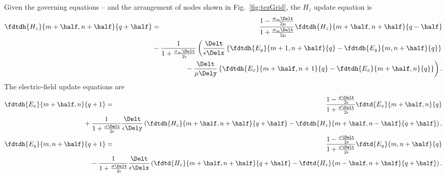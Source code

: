 Given the governing equations -- and the
arrangement of nodes shown in Fig.\ \ref{fig:tezGrid}, the $H_z$ update
equation is
\begin{eqnarray}
  \fdtdh{H_z}{m+\half,n+\half}{q+\half} &=&
  \frac{1-\frac{\sigma_m\Delt}{2\mu}}{1+\frac{\sigma_m\Delt}{2\mu}}
  \fdtdh{H_z}{m+\half,n+\half}{q-\half}
 \nonumber\\
  && \hspace{-.35in}\mbox{} -
  \frac{1}{1+\frac{\sigma_m\Delt}{2\epsilon}}
  \left(
    \frac{\Delt}{\epsilon\Delx}
    \left\{
      \fdtdh{E_y}{m+1,n+\half}{q} - \fdtdh{E_y}{m,n+\half}{q}
    \right\} \right.\nonumber\\
  && \hspace{.366in}\left.\mbox{}-
    \frac{\Delt}{\mu\Dely}
    \left\{
      \fdtdh{E_x}{m+\half,n+1}{q} - \fdtdh{E_x}{m+\half,n}{q}
    \right\}
  \right).
\end{eqnarray}
The electric-field update equations are
\begin{eqnarray}
  \fdtdh{E_x}{m+\half,n}{q+1} &=&
   \frac{1-\frac{\sigma\Delt}{2\epsilon}}{1+\frac{\sigma\Delt}{2\epsilon}}
   \fdtd{E_x}{m+\half,n}{q} \nonumber\\
   && \hspace{-.75in}\mbox{} +
   \frac{1}{1+\frac{\sigma\Delt}{2\epsilon}}
    \frac{\Delt}{\epsilon\Dely}
    \left(\fdtdh{H_z}{m+\half,n+\half}{q+\half}-
          \fdtdh{H_z}{m+\half,n-\half}{q+\half}\right),\\
  \fdtdh{E_y}{m,n+\half}{q+1} &=&
   \frac{1-\frac{\sigma\Delt}{2\epsilon}}{1+\frac{\sigma\Delt}{2\epsilon}}
   \fdtd{E_y}{m,n+\half}{q}\nonumber\\
   && \hspace{-.75in}\mbox{} -
   \frac{1}{1+\frac{\sigma\Delt}{2\epsilon}}
   \frac{\Delt}{\epsilon\Delx}
    \left(\fdtd{H_z}{m+\half,n+\half}{q+\half}-
          \fdtd{H_z}{m-\half,n+\half}{q+\half}\right).
\end{eqnarray}


